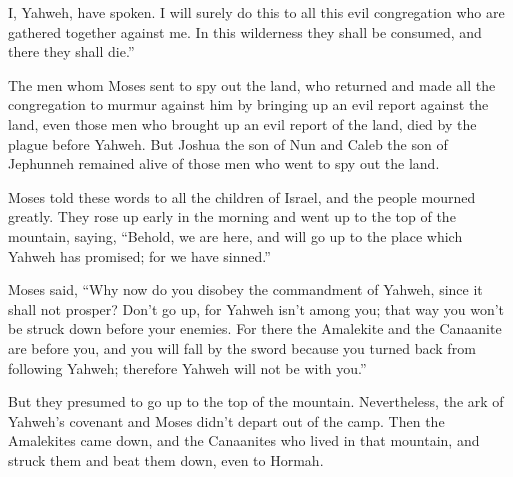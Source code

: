{I, Yahweh, have spoken. I will surely do this to all this evil congregation who are gathered together against me. In this wilderness they shall be consumed, and there they shall die.”
\par }{\PP {}The men whom Moses sent to spy out the land, who returned and made all the congregation to murmur against him by bringing up an evil report against the land,
even those men who brought up an evil report of the land, died by the plague before Yahweh.
But Joshua the son of Nun and Caleb the son of Jephunneh remained alive of those men who went to spy out the land.
\par }{\PP {}Moses told these words to all the children of Israel, and the people mourned greatly.
They rose up early in the morning and went up to the top of the mountain, saying, “Behold, we are here, and will go up to the place which Yahweh has promised; for we have sinned.”
\par }{\PP {}Moses said, “Why now do you disobey the commandment of Yahweh, since it shall not prosper?
Don’t go up, for Yahweh isn’t among you; that way you won’t be struck down before your enemies.
For there the Amalekite and the Canaanite are before you, and you will fall by the sword because you turned back from following Yahweh; therefore Yahweh will not be with you.”
\par }{\PP {}But they presumed to go up to the top of the mountain. Nevertheless, the ark of Yahweh’s covenant and Moses didn’t depart out of the camp.
Then the Amalekites came down, and the Canaanites who lived in that mountain, and struck them and beat them down, even to Hormah.

}
